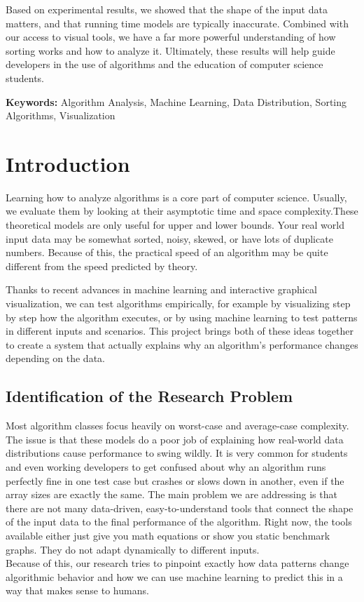 \documentclass[12pt,a4paper,oneside,openany]{report}
\begin{document}
Based on experimental results, we showed that the shape of the input data matters, and that running time models are typically inaccurate. Combined with our access to visual tools, we have a far more powerful understanding of how sorting works and how to analyze it. Ultimately, these results will help guide developers in the use of algorithms and the education of computer science students.

\textbf{Keywords:} Algorithm Analysis, Machine Learning, Data Distribution, Sorting Algorithms, Visualization


\chapter{Introduction}
Learning how to analyze algorithms is a core part of computer science. Usually, we evaluate them by looking at their asymptotic time and space complexity.These theoretical models are only useful for upper and lower bounds. Your real world input data may be somewhat sorted, noisy, skewed, or have lots of duplicate numbers. Because of this, the practical speed of an algorithm may be quite different from the speed predicted by theory.

Thanks to recent advances in machine learning and interactive graphical visualization, we can test algorithms empirically, for example by visualizing step by step how the algorithm executes, or by using machine learning to test patterns in different inputs and scenarios. This project brings both of these ideas together to create a system that actually explains why an algorithm's performance changes depending on the data.
\\[1cm]
\section{Identification of the Research Problem}
Most algorithm classes focus heavily on worst-case and average-case complexity. The issue is that these models do a poor job of explaining how real-world data distributions cause performance to swing wildly. It is very common for students and even working developers to get confused about why an algorithm runs perfectly fine in one test case but crashes or slows down in another, even if the array sizes are exactly the same.
The main problem we are addressing is that there are not many data-driven, easy-to-understand tools that connect the shape of the input data to the final performance of the algorithm. Right now, the tools available either just give you math equations or show you static benchmark graphs. They do not adapt dynamically to different inputs.\\
Because of this, our research tries to pinpoint exactly how data patterns change algorithmic behavior and how we can use machine learning to predict this in a way that makes sense to humans.\\[1cm]
\end{document}
